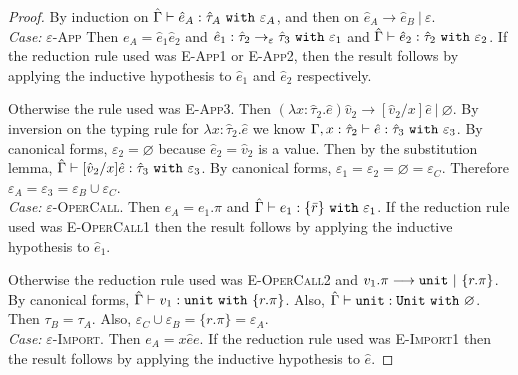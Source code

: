 \begin{proof} By induction on $\hat \Gamma \vdash \hat e_A: \hat \tau_A~\mathtt{with}~ \varepsilon_A$, and then on $\hat e_A \longrightarrow \hat e_B~|~\varepsilon$. \\

\textit{Case:} \textsc{$\varepsilon$-App} Then $e_A = \hat e_1 \hat e_2$ and $\hat e_1: \hat \tau_2 \rightarrow_{\varepsilon} \hat \tau_3~\mathtt{with}~ \varepsilon_1$ and $\hat \Gamma \vdash \hat e_2: \hat \tau_2~\mathtt{with}~ \varepsilon_2$. If the reduction rule used was \textsc{E-App1} or \textsc{E-App2}, then the result follows by applying the inductive hypothesis to $\hat e_1$ and $\hat e_2$ respectively.

Otherwise the rule used was \textsc{E-App3}. Then $(\lambda x: \hat \tau_2.\hat e)\hat v_2 \longrightarrow [\hat v_2/x]\hat e~|~\varnothing$. By inversion on the typing rule for $\lambda x: \hat \tau_2.\hat e$ we know $\Gamma, x: \hat \tau_2 \vdash \hat e: \hat \tau_3~\mathtt{with}~ \varepsilon_3$. By canonical forms, $\varepsilon_2 = \varnothing$ because $\hat e_2 = \hat v_2$ is a value. Then by the substitution lemma, $\hat \Gamma \vdash [\hat v_2/x]\hat e : \hat \tau_3~\mathtt{with}~ \varepsilon_3$. By canonical forms, $\varepsilon_1 = \varepsilon_2 = \varnothing = \varepsilon_C$. Therefore $\varepsilon_A = \varepsilon_3 = \varepsilon_B \cup \varepsilon_C$.\\

\textit{Case:} \textsc{$\varepsilon$-OperCall}. Then $e_A = e_1.\pi$ and $\hat \Gamma \vdash e_1 : \{ \bar r \}~\mathtt{with}~ \varepsilon_1$. If the reduction rule used was \textsc{E-OperCall1} then the result follows by applying the inductive hypothesis to $\hat e_1$.

Otherwise the reduction rule used was \textsc{E-OperCall2} and $v_1.\pi \longrightarrow \mathtt{unit}~|~\{ r.\pi \}$. By canonical forms, $\hat \Gamma \vdash v_1: \mathtt{unit}~\mathtt{with}~ \{ r.\pi \}$. Also, $\hat \Gamma \vdash \mathtt{unit}: \mathtt{Unit}~\mathtt{with}~ \varnothing$. Then $\tau_B = \tau_A$. Also, $\varepsilon_C \cup \varepsilon_B = \{ r.\pi \} = \varepsilon_A$.\\

\textit{Case:} \textsc{$\varepsilon$-Import}. Then $e_A = {x}{\hat e}{e}$. If the reduction rule used was \textsc{E-Import1} then the result follows by applying the inductive hypothesis to $\hat e$.


\end{proof}
